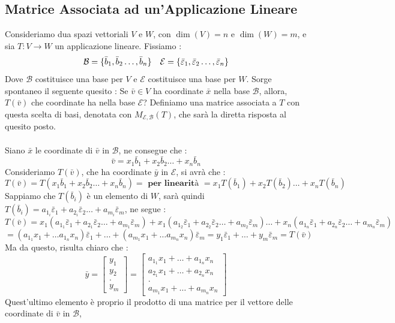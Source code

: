 \documentclass[12pt, letterpaper]{article}
\newcommand{\E}{{\mathcal E}}
\newcommand{\B}{{\mathcal B}}
\newcommand{\ve}{{\bar v}}
\newcommand{\spaz}{{\text{\hphantom{aa}}}}
\newcommand{\acc}{\\\hphantom{}\\}
\begin{document}
\subsection{Matrice Associata ad un'Applicazione Lineare}
Consideriamo dua spazi vettoriali \(V\) e \(W\), con \(\dim(V)=n\) e \(\dim(W)=m\), e sia \(T:V\rightarrow W\) 
un applicazione lineare. Fissiamo : $$
\mathcal{B}=\{\bar b_1,\bar b_2\dots,\bar b_n\}\spaz
\mathcal{E}=\{\bar \varepsilon_1,\bar \varepsilon_2\dots,\bar \varepsilon_n\}
$$
Dove \(\mathcal{B}\) costituisce una base per \(V\) e \(\mathcal{E}\) costituisce una base per \(W\). Sorge spontaneo il 
seguente quesito : Se \(\ve \in V\) ha coordinate \(\bar x\) nella base \(\mathcal{B}\), allora, \(T(\ve)\) che 
coordinate ha nella base \(\mathcal{E}\)? Definiamo una matrice associata a \(T\) con questa scelta 
di basi, denotata con \(M_{\E,\B}(T)\), che sarà la diretta risposta al quesito posto.\acc 
Siano \(\bar x\) le coordinate di \(\bar v\) in \(\B\), ne consegue che :$$
\bar v=x_1\bar b_1+x_2\bar b_2\dots+x_n\bar b_n
$$Consideriamo \(T(\bar v)\), che ha coordinate \(\bar y\) in \(\E\), si avrà che : $$
T(\ve)=T(x_1\bar b_1+x_2\bar b_2\dots+x_n\bar b_n)=\textbf{ per linearità }=x_1T(\bar b_1)+x_2T(\bar b_2)\dots + x_nT(\bar b_n)
$$
Sappiamo che \(T(\bar b_i)\) è un elemento di \(W\), sarà quindi 
 \(T(\bar b_i)=a_{1_i}\bar\varepsilon_1+a_{2_i}\bar\varepsilon_2\dots +a_{m_i}\bar\varepsilon_m\), ne segue :$$
T(\ve)=x_1(a_{1_1}\bar\varepsilon_1+a_{2_1}\bar\varepsilon_2\dots +a_{m_1}\bar\varepsilon_m)+
x_1(a_{1_2}\bar\varepsilon_1+a_{2_2}\bar\varepsilon_2\dots +a_{m_2}\bar\varepsilon_m)\dots+
x_n(a_{1_n}\bar\varepsilon_1+a_{2_n}\bar\varepsilon_2\dots +a_{m_n}\bar\varepsilon_m)
 $$$$
 =(a_{1_1}x_1+\dots a_{1_n}x_n)\bar\varepsilon_1+\dots +(a_{m_1}x_1+\dots a_{m_n}x_n)\bar\varepsilon_m=
 y_1\bar\varepsilon_1+\dots+y_m\bar\varepsilon_m=T(\bar v)
 $$
 Ma da questo, risulta chiaro che : $$
 \bar y=\begin{bmatrix}y_1\\y_2\\.\\y_m\end{bmatrix}=
 \begin{bmatrix}a_{1_1}x_1+\dots +a_{1_n}x_n\\a_{2_1}x_1+\dots +a_{2_n}x_n\\.\\a_{m_1}x_1+\dots+ a_{m_n}x_n\end{bmatrix}
 $$
 Quest'ultimo elemento è proprio il prodotto di una matrice per il vettore delle coordinate di \(\ve\) in \(\B\), 
\end{document}
